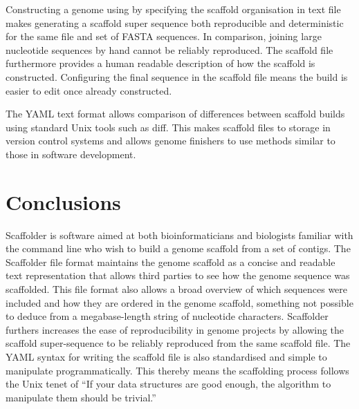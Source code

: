 \documentclass[10pt]{bmc_article}
\newenvironment{bmcformat}{\begin{raggedright}\baselineskip20pt\sloppy\setboolean{publ}{false}}{\end{raggedright}\baselineskip20pt\sloppy}
\begin{document}
\begin{bmcformat}
Constructing a genome using by specifying the scaffold organisation in text
file makes generating a scaffold super sequence both reproducible and
deterministic for the same file and set of FASTA sequences. In comparison,
joining large nucleotide sequences by hand cannot be reliably reproduced. The
scaffold file furthermore provides a human readable description of how the
scaffold is constructed. Configuring the final sequence in the scaffold file
means the build is easier to edit once already constructed. \pb

 \pb

The YAML text format  allows comparison of differences between
scaffold builds using standard Unix tools such as diff. This 
makes scaffold files  to storage in version control systems and
allows genome finishers to use methods similar to those in software
development. \pb 

\clearpage

\section*{Conclusions} %

Scaffolder is software aimed at both bioinformaticians and biologists familiar
with the command line who wish to build a genome scaffold from a set of
contigs. The Scaffolder file format maintains the genome scaffold as a concise
and readable text representation that allows third parties to see how the
genome sequence was scaffolded. This file format also allows a broad overview
of which sequences were included and how they are ordered in the genome
scaffold, something not possible to deduce from a megabase-length string of
nucleotide characters. Scaffolder furthers increases the ease of
reproducibility in genome projects by allowing the scaffold super-sequence to
be reliably reproduced from the same scaffold file. The YAML syntax for
writing the scaffold file is also standardised and simple to manipulate
programmatically. This thereby means the scaffolding process follows the Unix
tenet of ``If your data structures are good enough, the algorithm to
manipulate them should be trivial.''


\end{bmcformat}
\end{document}

